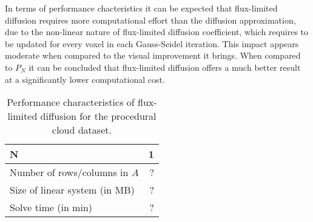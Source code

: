 In terms of performance chacteristics it can be expected that flux-limited diffusion requires more computational effort than the diffusion approximation, due to the non-linear nature of flux-limited diffusion coefficient, which requires to be updated for every voxel in each Gauss-Seidel iteration. This impact appears moderate when compared to the visual improvement it brings. When compared to $P_N$ it can be concluded that flux-limited diffusion offers a much better result at a significantly lower computational cost.
\begin{table}[!h]
	\centering
	\caption[TODO]{Performance characteristics of flux-limited diffusion for the procedural cloud dataset.}
	\label{tab:results_cloud}
	\begin{tabular}{l r}
    \hline
	\textbf{N}
    & 1
    \\
    \hline
    Number of rows/columns in $A$
    & ?
    \\
    Size of linear system (in MB)
    & ?
    \\
    Solve time (in min)
    & ?
	\end{tabular}
\end{table}
